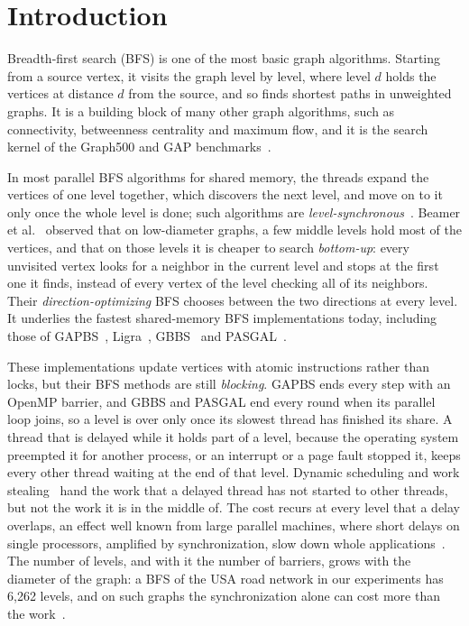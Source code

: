 \section{Introduction}
\label{sec:intro}

Breadth-first search (BFS) is one of the most basic graph algorithms. Starting from a source vertex, it visits the graph level by level, where level $d$ holds the vertices at distance $d$ from the source, and so finds shortest paths in unweighted graphs. It is a building block of many other graph algorithms, such as connectivity, betweenness centrality and maximum flow, and it is the search kernel of the Graph500 and GAP benchmarks~\cite{graph500, gapbs}.

In most parallel BFS algorithms for shared memory, the threads expand the vertices of one level together, which discovers the next level, and move on to it only once the whole level is done; such algorithms are \emph{level-synchronous}~\cite{bader_bfs, charles_bfs}. Beamer et al.~\cite{beamer_dobfs} observed that on low-diameter graphs, a few middle levels hold most of the vertices, and that on those levels it is cheaper to search \emph{bottom-up}: every unvisited vertex looks for a neighbor in the current level and stops at the first one it finds, instead of every vertex of the level checking all of its neighbors. Their \emph{direction-optimizing} BFS chooses between the two directions at every level. It underlies the fastest shared-memory BFS implementations today, including those of GAPBS~\cite{gapbs}, Ligra~\cite{ligra}, GBBS~\cite{gbbs} and PASGAL~\cite{pasgal}.

These implementations update vertices with atomic instructions rather than locks, but their BFS methods are still \emph{blocking}. GAPBS ends every step with an OpenMP barrier, and GBBS and PASGAL end every round when its parallel loop joins, so a level is over only once its slowest thread has finished its share. A thread that is delayed while it holds part of a level, because the operating system preempted it for another process, or an interrupt or a page fault stopped it, keeps every other thread waiting at the end of that level. Dynamic scheduling and work stealing~\cite{blumofe_workstealing} hand the work that a delayed thread has not started to other threads, but not the work it is in the middle of. The cost recurs at every level that a delay overlaps, an effect well known from large parallel machines, where short delays on single processors, amplified by synchronization, slow down whole applications~\cite{petrini_noise, hoefler_noise}. The number of levels, and with it the number of barriers, grows with the diameter of the graph: a BFS of the USA road network in our experiments has 6,262 levels, and on such graphs the synchronization alone can cost more than the work~\cite{pasgal}.

